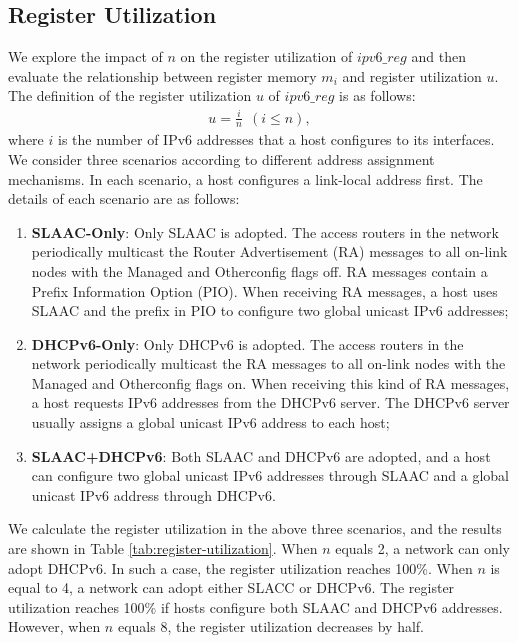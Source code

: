 \documentclass[journal]{IEEEtran}
\begin{document}
    \subsection{Register Utilization}
        We explore the impact of $n$ on the register utilization of $ipv6\_reg$ and then evaluate the relationship between register memory $m_i$ and register utilization $u$. The definition of the register utilization $u$ of $ipv6\_reg$ is as follows: 
        \begin{equation}
                \label{register-utilization-calculation}
                \begin{aligned}
                    u = \frac{i}{n}\ \ (i \leq n),
                \end{aligned}
        \end{equation}
        where $i$ is the number of IPv6 addresses that a host configures to its interfaces.
        We consider three scenarios according to different address assignment mechanisms. In each scenario, a host configures a link-local address first. The details of each scenario are as follows:
        \begin{enumerate}[1)]
            \item \textbf{SLAAC-Only}: Only SLAAC is adopted. The access routers in the network periodically multicast the Router Advertisement (RA) messages \cite{NDP} to all on-link nodes with the Managed and Otherconfig flags off. RA messages contain a Prefix Information Option (PIO). When receiving RA messages, a host uses SLAAC and the prefix in PIO to configure two global unicast IPv6 addresses;

            \item \textbf{DHCPv6-Only}: Only DHCPv6 is adopted. The access routers in the network periodically multicast the RA messages to all on-link nodes with the Managed and Otherconfig flags on. When receiving this kind of RA messages, a host requests IPv6 addresses from the DHCPv6 server. The DHCPv6 server usually assigns a global unicast IPv6 address to each host;

            \item \textbf{SLAAC+DHCPv6}: Both SLAAC and DHCPv6 are adopted, and a host can configure two global unicast IPv6 addresses through SLAAC and a global unicast IPv6 address through DHCPv6.
        \end{enumerate}
        We calculate the register utilization in the above three scenarios, and the results are shown in Table \ref{tab:register-utilization}. When $n$ equals 2, a network can only adopt DHCPv6. In such a case, the register utilization reaches 100\%. When $n$ is equal to 4, a network can adopt either SLACC or DHCPv6. The register utilization reaches 100\% if hosts configure both SLAAC and DHCPv6 addresses. However, when $n$ equals 8, the register utilization decreases by half.
\end{document}
